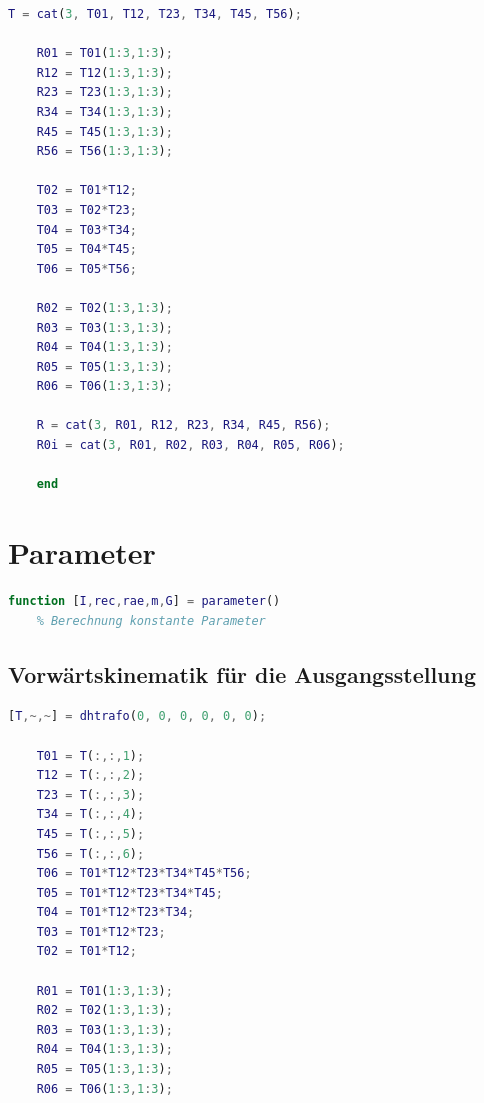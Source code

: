\begin{lstlisting}[language=Matlab, numbers=none]
	T = cat(3, T01, T12, T23, T34, T45, T56);
	
	R01 = T01(1:3,1:3);
	R12 = T12(1:3,1:3);
	R23 = T23(1:3,1:3);
	R34 = T34(1:3,1:3);
	R45 = T45(1:3,1:3);
	R56 = T56(1:3,1:3);
	
	T02 = T01*T12;
	T03 = T02*T23;
	T04 = T03*T34;
	T05 = T04*T45;
	T06 = T05*T56;
	
	R02 = T02(1:3,1:3);
	R03 = T03(1:3,1:3);
	R04 = T04(1:3,1:3);
	R05 = T05(1:3,1:3);
	R06 = T06(1:3,1:3);
	
	R = cat(3, R01, R12, R23, R34, R45, R56);
	R0i = cat(3, R01, R02, R03, R04, R05, R06);
	
	end
\end{lstlisting}
\label{add:systemparameter}
%
%
%
\setcounter{section}{1}
\section{Parameter}
\begin{lstlisting}[language=Matlab, numbers=none]
	function [I,rec,rae,m,G] = parameter()
	% Berechnung konstante Parameter
\end{lstlisting}
%
\subsection{Vorwärtskinematik für die Ausgangsstellung}
%
\begin{lstlisting}[language=Matlab, numbers=none]
	[T,~,~] = dhtrafo(0, 0, 0, 0, 0, 0);
	
	T01 = T(:,:,1);
	T12 = T(:,:,2);
	T23 = T(:,:,3);
	T34 = T(:,:,4);
	T45 = T(:,:,5);
	T56 = T(:,:,6);
	T06 = T01*T12*T23*T34*T45*T56;
	T05 = T01*T12*T23*T34*T45;
	T04 = T01*T12*T23*T34;
	T03 = T01*T12*T23;
	T02 = T01*T12;
	
	R01 = T01(1:3,1:3);
	R02 = T02(1:3,1:3);
	R03 = T03(1:3,1:3);
	R04 = T04(1:3,1:3);
	R05 = T05(1:3,1:3);
	R06 = T06(1:3,1:3);
\end{lstlisting}
%
